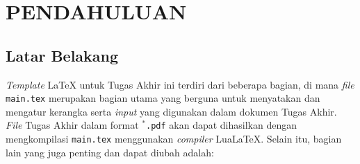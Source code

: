 \renewcommand{\thechapter}{\Roman{chapter}}
\chapter{PENDAHULUAN}
\renewcommand{\thechapter}{\arabic{chapter}}
\pagestyle{konten}

\section{Latar Belakang}

\textit{Template} \LaTeX{} untuk Tugas Akhir ini terdiri dari beberapa bagian, di mana \textit{file} \texttt{main.tex} merupakan bagian utama yang berguna untuk menyatakan dan mengatur kerangka serta \textit{input} yang digunakan dalam dokumen Tugas Akhir. \textit{File} Tugas Akhir dalam format \texttt{$^*$.pdf} akan dapat dihasilkan dengan mengkompilasi \texttt{main.tex} menggunakan \textit{compiler} Lua\LaTeX. Selain itu, bagian lain yang juga penting dan dapat diubah adalah:

